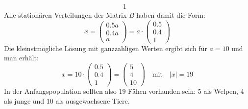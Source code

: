 \begin{exercise}
\begin{enumerate}[a)]
\begin{alignat*}{1}
\begin{array}{r|rcl}
                \end{array}
              \end{alignat*}
            \endgroup
            Alle stationären Verteilungen der Matrix
            $B$ haben damit die Form:
            \begin{equation*}
              x=\begin{pmatrix}\num{0.5}a\\\num{0.4}a\\a\end{pmatrix}
               =a\cdot\begin{pmatrix}\num{0.5}\\\num{0.4}\\\num{1}\end{pmatrix}
            \end{equation*}
            Die kleinstmögliche Lösung mit
            ganzzahligen Werten ergibt sich
            für $a=\num{10}$ und man
            erhält:
            \begin{equation*}
              x=10\cdot\begin{pmatrix}\num{0.5}\\\num{0.4}\\\num{1}\end{pmatrix}
               =\begin{pmatrix}5\\4\\10\end{pmatrix}
              \quad\text{mit}\quad
              |x|=\num{19}
            \end{equation*}
            In der Anfangspopulation sollten also
            \num{19} Fähen vorhanden sein: \num{5}
            als Welpen, \num{4} als junge und
            \num{10} als ausgewachsene Tiere.
    \end{enumerate}
  \fi
\end{exercise}
